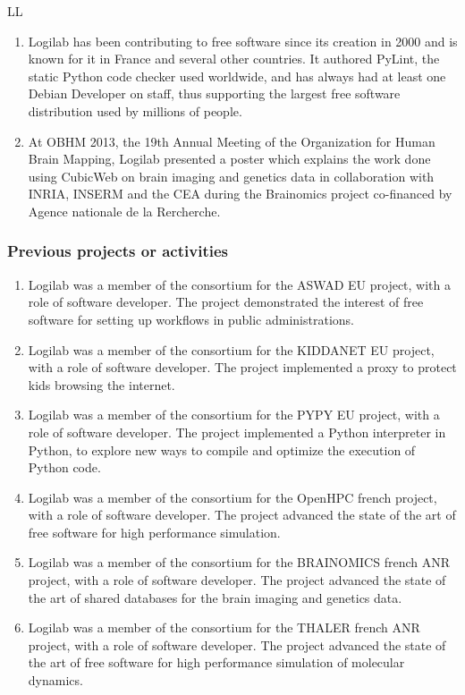 \begin{sitedescription}{LL}
\begin{enumerate}
\item Logilab has been contributing to free software since its creation in 2000
  and is known for it in France and several other countries. It authored PyLint,
  the static Python code checker used worldwide, and has always had at least one
  Debian Developer on staff, thus supporting the largest free software
  distribution used by millions of people.

 \item At OBHM 2013, the 19th Annual Meeting of the Organization for Human Brain
   Mapping, Logilab presented a poster which explains the work done using
   CubicWeb on brain imaging and genetics data in collaboration with INRIA,
   INSERM and the CEA during the Brainomics project co-financed by Agence
   nationale de la Rercherche.

\end{enumerate}

\subsubsection*{Previous projects or activities}

\begin{enumerate}
\item Logilab was a member of the consortium for the ASWAD EU project, with a
  role of software developer. The project demonstrated the interest of free
  software for setting up workflows in public administrations.
\item Logilab was a member of the consortium for the KIDDANET EU project, with a
  role of software developer. The project implemented a proxy to protect kids
  browsing the internet.
\item Logilab was a member of the consortium for the PYPY EU project, with a
  role of software developer. The project implemented a Python interpreter in
  Python, to explore new ways to compile and optimize the execution of Python
  code.
\item Logilab was a member of the consortium for the OpenHPC french project,
  with a role of software developer. The project advanced the state of the art
  of free software for high performance simulation.
\item Logilab was a member of the consortium for the BRAINOMICS french ANR
  project, with a role of software developer. The project advanced the state of
  the art of shared databases for the brain imaging and genetics data.
\item Logilab was a member of the consortium for the THALER french ANR project,
  with a role of software developer. The project advanced the state of the art
  of free software for high performance simulation of molecular dynamics.
\end{enumerate}


\end{sitedescription}
